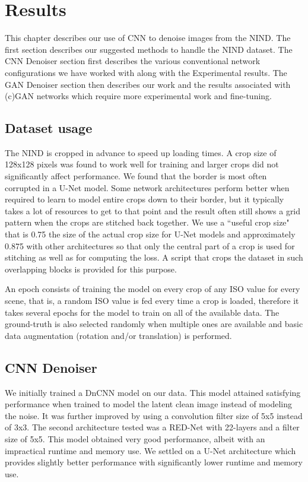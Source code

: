 \chapter{Results}

This chapter describes our use of \ac{CNN} to denoise images from the \ac{NIND}. The first section describes our suggested methods to handle the \ac{NIND} dataset. The \ac{CNN} Denoiser section first describes the various conventional network configurations we have worked with along with the Experimental results. The \ac{GAN} Denoiser section then describes our work and the results associated with (c)\ac{GAN} networks which require more experimental work and fine-tuning. 

\section{Dataset usage}\label{sec:Dataset Usage}
The \ac{NIND} is cropped in advance to speed up loading times. A crop size of 128x128 pixels was found to work well for training and larger crops did not significantly affect performance. We found that the border is most often corrupted in a U-Net model. Some network architectures perform better when required to learn to model entire crops down to their border, but it typically takes a lot of resources to get to that point and the result often still shows a grid pattern when the crops are stitched back together. We use a ``useful crop size" that is 0.75 the size of the actual crop size for U-Net models and approximately 0.875 with other architectures so that only the central part of a crop is used for stitching as well as for computing the loss. A script that crops the dataset in such overlapping blocks is provided for this purpose.

An epoch consists of training the model on every crop of any ISO value for every scene, that is, a random ISO value is fed every time a crop is loaded, therefore it takes several epochs for the model to train on all of the available data. The ground-truth is also selected randomly when multiple ones are available and basic data augmentation (rotation and/or translation) is performed.

\section{CNN Denoiser}\label{sec:CNN Denoiser}
We initially trained a DnCNN \cite{dncnn} model on our data. This model attained satisfying performance when trained to model the latent clean image instead of modeling the noise. It was further improved by using a convolution filter size of 5x5 instead of 3x3. The second architecture tested was a \ac{RED-Net} \cite{rednet} with 22-layers and a filter size of 5x5. This model obtained very good performance, albeit with an impractical runtime and memory use. We settled on a U-Net \cite{unet} architecture which provides slightly better performance with significantly lower runtime and memory use.

